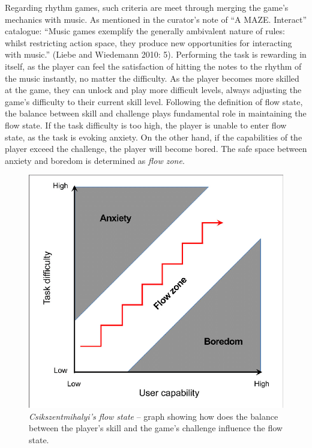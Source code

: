 Regarding rhythm games, such criteria are meet through merging the game’s mechanics with music. As mentioned in the curator’s note of ``A MAZE. Interact'' \cite{MAZE} catalogue: ``Music games exemplify the generally ambivalent nature of rules: whilst restricting action space, they produce new opportunities for interacting with music.'' (Liebe and Wiedemann 2010: 5). Performing the task is rewarding in itself, as the player can feel the satisfaction of hitting the notes to the rhythm of the music instantly, no matter the difficulty. As the player becomes more skilled at the game, they can unlock and play more difficult levels, always adjusting the game’s difficulty to their current skill level. Following the definition of flow state, the balance between skill and challenge plays fundamental role in maintaining the flow state. If the task difficulty is too high, the player is unable to enter flow state, as the task is evoking anxiety. On the other hand, if the capabilities of the player exceed the challenge, the player will become bored. The safe space between anxiety and boredom is determined as \textit{flow zone}.

\begin{figure}[h]
    \centering\includegraphics[scale=0.3]{obrazki/flowstategraph.png}
    \caption{\textit{Csikszentmihalyi’s flow state} -- graph showing how does the balance between the player’s skill and the game’s challenge influence the flow state.
    \cite{csikszentmihalyi1990flow}}
    \label{fig:flowstategraph}
\end{figure}

